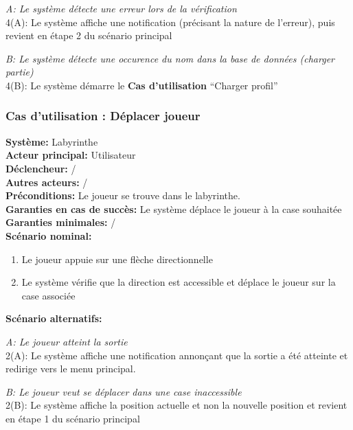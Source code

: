\documentclass{butexFR}
\begin{document}
\emph{A: Le système détecte une erreur lors de la vérification}\\
\hspace*{1em}4(A): Le système affiche une notification %
(précisant la nature de l'erreur), puis revient en étape 2 du scénario principal

\emph{B: Le système détecte une occurence du nom dans la base de données (charger partie)}\\
\hspace*{1em}4(B): Le système démarre le \textbf{Cas d'utilisation} ``Charger profil''

\newpage

\subsubsection{%
Cas d’utilisation : Déplacer joueur}
\textbf{Système:} Labyrinthe\\
\textbf{Acteur principal:} Utilisateur\\
\textbf{Déclencheur:} /\\
\textbf{Autres acteurs:} /\\[0.25em]
\textbf{Préconditions:} %
Le joueur se trouve dans le labyrinthe.\\
\textbf{Garanties en cas de succès:} Le système %
déplace le joueur à la case souhaitée\\
\textbf{Garanties minimales:} /\\[0.25em]
\textbf{Scénario nominal:}
\begin{enumerate}
    \item Le joueur appuie sur une flèche directionnelle
    \item Le système vérifie que la direction est accessible et déplace le joueur sur la case associée
\end{enumerate}
\textbf{Scénario alternatifs:}

\emph{A: Le joueur %
atteint la sortie}\\
\hspace*{1em}2(A): Le système affiche une notification annonçant que la sortie a été atteinte et redirige vers le menu principal.

\emph{B: Le joueur veut se déplacer dans une case inaccessible}\\
\hspace*{1em}2(B): Le système affiche la position actuelle %
et non la nouvelle position et revient en étape 1 du scénario principal
\end{document}
